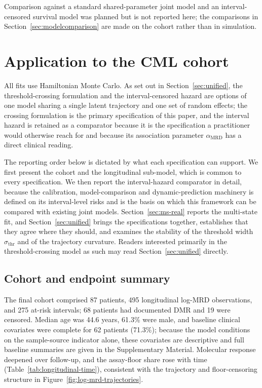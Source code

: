 \documentclass[11pt]{article}
\begin{document}
Comparison against a standard shared-parameter joint model and an
interval-censored survival model was planned but is not reported here; the
comparisons in Section~\ref{sec:modelcomparison} are made on the cohort rather
than in simulation.

\section{Application to the CML cohort}
\label{sec:application}

All fits use Hamiltonian Monte Carlo. As set out in
Section~\ref{sec:unified}, the threshold-crossing formulation and the
interval-censored hazard are options of one model sharing a single latent
trajectory and one set of random effects; the crossing formulation is the
primary specification of this paper, and the interval hazard is retained as a
comparator because it is the specification a practitioner would otherwise reach
for and because its association parameter $\alpha_{\mathrm{MRD}}$ has a direct
clinical reading.

The reporting order below is dictated by what each specification can support.
We first present the cohort and the longitudinal sub-model, which is common to
every specification. We then report the interval-hazard comparator in detail,
because the calibration, model-comparison and dynamic-prediction machinery is
defined on its interval-level risks and is the basis on which this framework can
be compared with existing joint models. Section~\ref{sec:ms-real} reports the
multi-state fit, and Section~\ref{sec:unified} brings the specifications
together, establishes that they agree where they should, and examines the
stability of the threshold width $\sigma_{\mathrm{thr}}$ and of the trajectory
curvature. Readers interested primarily in the threshold-crossing model as such
may read Section~\ref{sec:unified} directly.

\subsection{Cohort and endpoint summary}

The final cohort comprised 87 patients, 495 longitudinal log-MRD
observations, and 275 at-risk intervals; 68 patients had documented DMR
and 19 were censored. Median age was 44.6 years, 61.3\% were male, and
baseline clinical covariates were complete for 62 patients (71.3\%); because
the model conditions on the sample-source indicator alone, these covariates are
descriptive and full baseline summaries are given in the Supplementary Material.
Molecular response deepened over follow-up, and the assay-floor share rose with
time (Table~\ref{tab:longitudinal-time}), consistent with the trajectory and
floor-censoring structure in Figure~\ref{fig:log-mrd-trajectories}.
\end{document}
